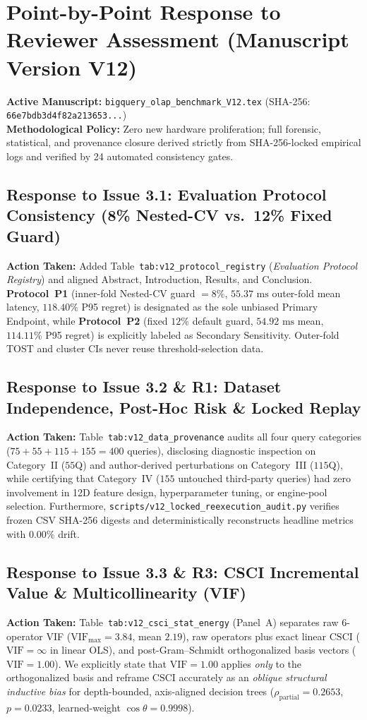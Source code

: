 \documentclass[11pt,a4paper]{article}
\begin{document}
\section*{Point-by-Point Response to Reviewer Assessment (Manuscript Version V12)}
\noindent\textbf{Active Manuscript:} \texttt{bigquery\_olap\_benchmark\_V12.tex} (SHA-256: \texttt{66e7bdb3d4f82a213653...})\\
\noindent\textbf{Methodological Policy:} Zero new hardware proliferation; full forensic, statistical, and provenance closure derived strictly from SHA-256-locked empirical logs and verified by 24 automated consistency gates.

\subsection*{Response to Issue 3.1: Evaluation Protocol Consistency (8\% Nested-CV vs.\ 12\% Fixed Guard)}
\textbf{Action Taken:} Added Table~\texttt{tab:v12\_protocol\_registry} (\emph{Evaluation Protocol Registry}) and aligned Abstract, Introduction, Results, and Conclusion. \textbf{Protocol~P1} (inner-fold Nested-CV guard $=8\%$, $55.37\text{ ms}$ outer-fold mean latency, $118.40\%$ P95 regret) is designated as the sole unbiased Primary Endpoint, while \textbf{Protocol~P2} (fixed $12\%$ default guard, $54.92\text{ ms}$ mean, $114.11\%$ P95 regret) is explicitly labeled as Secondary Sensitivity. Outer-fold TOST and cluster CIs never reuse threshold-selection data.

\subsection*{Response to Issue 3.2 \& R1: Dataset Independence, Post-Hoc Risk \& Locked Replay}
\textbf{Action Taken:} Table~\texttt{tab:v12\_data\_provenance} audits all four query categories ($75 + 55 + 115 + 155 = 400$ queries), disclosing diagnostic inspection on Category~II ($55$Q) and author-derived perturbations on Category~III ($115$Q), while certifying that Category~IV ($155$ untouched third-party queries) had zero involvement in 12D feature design, hyperparameter tuning, or engine-pool selection. Furthermore, \texttt{scripts/v12\_locked\_reexecution\_audit.py} verifies frozen CSV SHA-256 digests and deterministically reconstructs headline metrics with $0.00\%$ drift.

\subsection*{Response to Issue 3.3 \& R3: CSCI Incremental Value \& Multicollinearity (VIF)}
\textbf{Action Taken:} Table~\texttt{tab:v12\_csci\_stat\_energy} (Panel~A) separates raw 6-operator VIF ($\text{VIF}_{\max}=3.84$, mean $2.19$), raw operators plus exact linear $\text{CSCI}$ ($\text{VIF}=\infty$ in linear OLS), and post-Gram--Schmidt orthogonalized basis vectors ($\text{VIF}=1.00$). We explicitly state that $\text{VIF}=1.00$ applies \emph{only} to the orthogonalized basis and reframe $\text{CSCI}$ accurately as an \emph{oblique structural inductive bias} for depth-bounded, axis-aligned decision trees ($\rho_{\text{partial}}=0.2653$, $p=0.0233$, learned-weight $\cos\theta=0.9998$).
\end{document}
